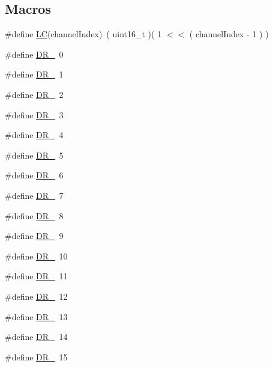 \subsection*{Macros}
\begin{DoxyCompactItemize}
\item 
\#define \hyperlink{group__REGION_ga12fa17e5c1016e01a9d82c25027deb1b}{LC}(channel\+Index)~( uint16\+\_\+t )( 1 $<$$<$ ( channel\+Index -\/ 1 ) )
\item 
\#define \hyperlink{group__REGION_ga6c4ef966b4f3d5eb7597b087f2b97095}{D\+R\+\_}~0
\item 
\#define \hyperlink{group__REGION_ga87e71569dc5f2114e685560de072af26}{D\+R\+\_}~1
\item 
\#define \hyperlink{group__REGION_gad402daa928a8b3dea829315fab69de17}{D\+R\+\_}~2
\item 
\#define \hyperlink{group__REGION_ga3627849e6360cd275bc74dc519653820}{D\+R\+\_}~3
\item 
\#define \hyperlink{group__REGION_ga6ceba6158a7dab238e9d0b846fb47a0c}{D\+R\+\_}~4
\item 
\#define \hyperlink{group__REGION_ga872e12c82020c02a7f70a1c6ed1375df}{D\+R\+\_}~5
\item 
\#define \hyperlink{group__REGION_ga8e2b4c15b7dbb8bda5ed635ca1d262be}{D\+R\+\_}~6
\item 
\#define \hyperlink{group__REGION_ga3a06805baf4f00911a3a5d3dbadebf61}{D\+R\+\_}~7
\item 
\#define \hyperlink{group__REGION_ga44cc96ba80ae464cd9330b784d329c16}{D\+R\+\_}~8
\item 
\#define \hyperlink{group__REGION_ga67346d631ba28781d6dffb2a7b6fd22f}{D\+R\+\_}~9
\item 
\#define \hyperlink{group__REGION_ga8cc471faabc38682537f6a60a30844e4}{D\+R\+\_}~10
\item 
\#define \hyperlink{group__REGION_ga77672781eaa7dc6f6892195739a5ef27}{D\+R\+\_}~11
\item 
\#define \hyperlink{group__REGION_gafcf0cda11eda5db3d4c4e9a5bd79c0d5}{D\+R\+\_}~12
\item 
\#define \hyperlink{group__REGION_ga226f47470cc69a6fe831f7c92709bc1f}{D\+R\+\_}~13
\item 
\#define \hyperlink{group__REGION_ga5319f091a90ef4a360cb732be49927c6}{D\+R\+\_}~14
\item 
\#define \hyperlink{group__REGION_gac6e078f51b71f05093daf27834997396}{D\+R\+\_}~15
\item 
$$
\end{DoxyCompactItemize}
